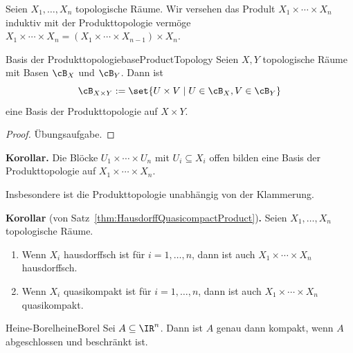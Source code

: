\documentclass[language=ngerman]{TemplateLecture} %
\begin{document}
Seien $X_1, \ldots, X_n$ topologische Räume. Wir versehen das Prodult $X_1 \times \cdots \times X_n$ induktiv mit der Produkttopologie vermöge $X_1 \times \cdots \times X_n = (X_1 \times \cdots \times X_{n-1}) \times X_n$.

\begin{lem}{Basis der Produkttopologie}{baseProductTopology}
    Seien $X, Y$ topologische Räume mit Basen $\cB_X$ und $\cB_Y$. Dann ist 
    \begin{equation*}
        \cB_{X \times Y} := \set{U \times V \mid U \in \cB_X, V \in \cB_Y}
    \end{equation*}
    eine Basis der Produkttopologie auf $X \times Y$.
\end{lem}
\begin{proof}
    Übungsaufgabe.
\end{proof}

\textbf{Korollar.} Die Blöcke $U_1 \times \cdots \times U_n$ mit $U_i \subseteq X_i$ offen bilden eine Basis der Produkttopologie auf $X_1 \times \cdots \times X_n$. 

Insbesondere ist die Produkttopologie unabhängig von der Klammerung.

\textbf{Korollar} (von Satz~\ref{thm:HausdorffQuasicompactProduct})\textbf{.} Seien $X_1, \ldots, X_n$ topologische Räume.
\begin{enumerate}[$(i)$]
    \item Wenn $X_i$ hausdorffsch ist für $i = 1,\ldots,n$, dann ist auch $X_1 \times \cdots \times X_n$ hausdorffsch.
    \item Wenn $X_i$ quasikompakt ist für $i = 1,\ldots,n$, dann ist auch $X_1 \times \cdots \times X_n$ quasikompakt.
\end{enumerate}

\begin{thm}{Heine-Borel}{heineBorel}
    Sei $A \subseteq \IR^n$. Dann ist $A$ genau dann kompakt, wenn $A$ abgeschlossen und beschränkt ist.
\end{thm}
\end{document}
